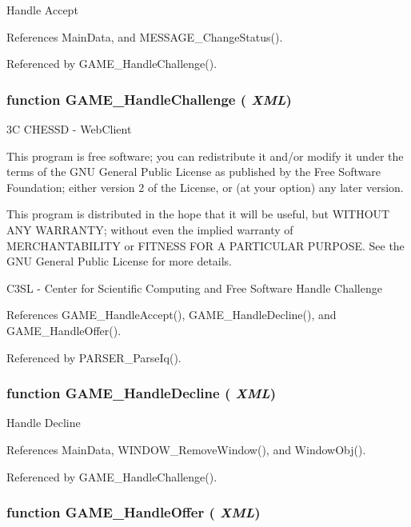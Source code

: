 Handle Accept 

References MainData, and MESSAGE\_\-ChangeStatus().

Referenced by GAME\_\-HandleChallenge().
\subsubsection{\setlength{\rightskip}{0pt plus 5cm}function GAME\_\-HandleChallenge ( {\em XML})}\label{game_2challenge_8js_bbb5eb541104b1e497b1f1431d1e928a}


3C CHESSD - WebClient

This program is free software; you can redistribute it and/or modify it under the terms of the GNU General Public License as published by the Free Software Foundation; either version 2 of the License, or (at your option) any later version.

This program is distributed in the hope that it will be useful, but WITHOUT ANY WARRANTY; without even the implied warranty of MERCHANTABILITY or FITNESS FOR A PARTICULAR PURPOSE. See the GNU General Public License for more details.

C3SL - Center for Scientific Computing and Free Software Handle Challenge 

References GAME\_\-HandleAccept(), GAME\_\-HandleDecline(), and GAME\_\-HandleOffer().

Referenced by PARSER\_\-ParseIq().
\subsubsection{\setlength{\rightskip}{0pt plus 5cm}function GAME\_\-HandleDecline ( {\em XML})}\label{game_2challenge_8js_a06650da741443de15313a13b407c0d2}


Handle Decline 

References MainData, WINDOW\_\-RemoveWindow(), and WindowObj().

Referenced by GAME\_\-HandleChallenge().
\subsubsection{\setlength{\rightskip}{0pt plus 5cm}function GAME\_\-HandleOffer ( {\em XML})}\label{game_2challenge_8js_ed65a9f90c7c33bb525cf32fc59a52e5}


